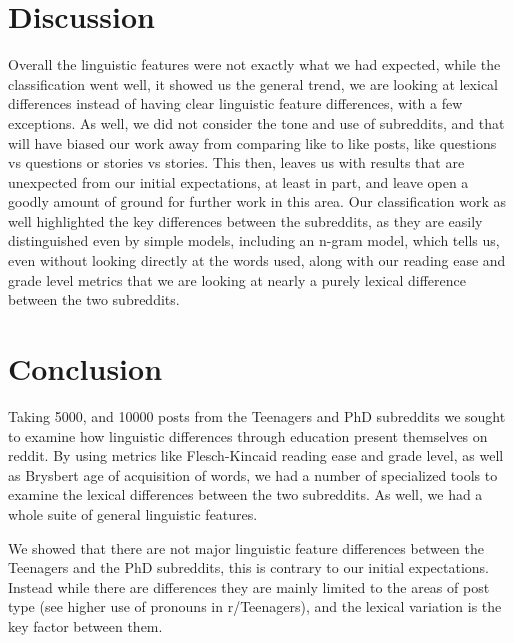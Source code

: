 \documentclass[11pt]{article}
\begin{document}
\section{Discussion}


Overall the linguistic features were not exactly what we had expected, while the classification went well, it showed us the general trend, we are looking at lexical differences instead of having clear linguistic feature differences, with a few exceptions. As well, we did not consider the tone and use of subreddits, and that will have biased our work away from comparing like to like posts, like questions vs questions or stories vs stories. This then, leaves us with results that are unexpected from our initial expectations, at least in part, and leave open a goodly amount of ground for further work in this area. Our classification work as well highlighted the key differences between the subreddits, as they are easily distinguished even by simple models, including an n-gram model, which tells us, even without looking directly at the words used, along with our reading ease and grade level metrics that we are looking at nearly a purely lexical difference between the two subreddits. 

\section{Conclusion}
Taking 5000, and 10000 posts from the Teenagers and PhD subreddits we sought to examine how linguistic differences through education present themselves on reddit. By using metrics like Flesch-Kincaid reading ease and grade level, as well as Brysbert age of acquisition of words, we had a number of specialized tools to examine the lexical differences between the two subreddits. As well, we had a whole suite of general linguistic features. 

We showed that there are not major linguistic feature differences between the Teenagers and the PhD subreddits, this is contrary to our initial expectations. Instead while there are differences they are mainly limited to the areas of post type (see higher use of pronouns in r/Teenagers), and the lexical variation is the key factor between them. 
\appendix
\end{document}
